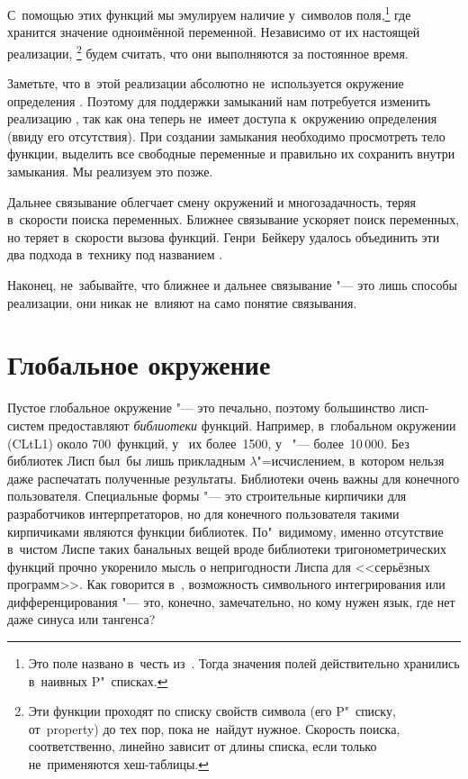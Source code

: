 С~помощью этих функций мы эмулируем наличие у~символов поля,\footnote*{Это поле
названо в~честь  из~\cite{mae+62}. 
Тогда значения полей действительно хранились в~наивных P"~списках.} где хранится
значение одноимённой переменной. Независимо от их настоящей реализации,%
\footnote*{Эти функции проходят по списку свойств символа (его P"~списку,
от~property) до тех пор, пока не~найдут нужное. Скорость поиска, соответственно,
линейно зависит от длины списка, если только не~применяются хеш-таблицы.} будем
считать, что они выполняются за постоянное время.

Заметьте, что в~этой реализации абсолютно не~используется окружение определения
. Поэтому для поддержки замыканий нам потребуется изменить реализацию
, так как она теперь не~имеет доступа к~окружению определения
(ввиду его отсутствия). При создании замыкания необходимо просмотреть тело
функции, выделить все свободные переменные и правильно их сохранить внутри
замыкания. Мы реализуем это позже.

Дальнее связывание облегчает смену окружений и многозадачность, теряя в~скорости
поиска переменных. Ближнее связывание ускоряет поиск переменных, но теряет
в~скорости вызова функций. Генри~Бейкеру \cite{bak78} удалось объединить эти два
подхода в~технику под названием .

Наконец, не~забывайте, что ближнее и дальнее связывание "--- это лишь способы
реализации, они никак не~влияют на само понятие связывания.


\section{Глобальное окружение}\label{basics/sect:global-environment}

Пустое глобальное окружение "--- это печально, поэтому большинство лисп-систем
предоставляют \emph{библиотеки} функций. Например, в~глобальном окружении
{\CommonLisp} (CLtL1) около 700~функций, у~{\LeLisp} их более~1500,
у~{\ZetaLisp} "--- более~10\,000. Без библиотек Лисп был~бы лишь прикладным
$\lambda$"=исчислением, в~котором нельзя даже распечатать полученные результаты.
Библиотеки очень важны для конечного пользователя. Специальные формы "--- это
строительные кирпичики для разработчиков интерпретаторов, но для конечного
пользователя такими кирпичиками являются функции библиотек. По"~видимому, именно
отсутствие в~чистом Лиспе таких банальных вещей вроде библиотеки
тригонометрических функций прочно укоренило мысль о непригодности Лиспа для
<<серьёзных программ>>. Как говорится в~\cite{sla61}, возможность символьного
интегрирования или дифференцирования "--- это, конечно, замечательно, но кому
нужен язык, где нет даже синуса или тангенса?

